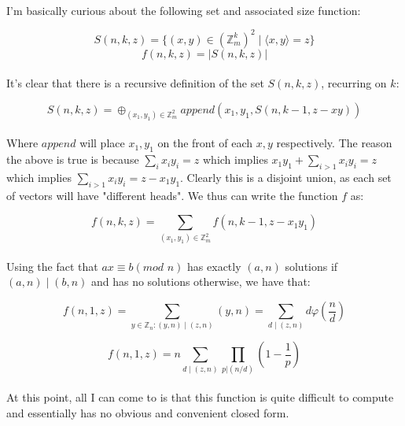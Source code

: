 \documentclass{article}
\begin{document}
\paragraph*{}
  I'm basically curious about the following set and associated size function:

\[S(n, k, z) = \{ (x, y) \in (\mathbb{Z}_m^k)^2 \mid \langle x, y \rangle = z \} \] 
\[f(n, k, z) = |S(n, k, z)| \]

\paragraph*{}
  It's clear that there is a recursive definition of the set $S(n, k, z)$, recurring
  on $k$:

\[ S(n, k, z) = \oplus_{(x_1, y_1) \in \mathbb{Z}_m^2} append(x_1, y_1, S(n, k - 1, z - xy)) \]

\paragraph*{}
  Where $append$ will place $x_1, y_1$ on the front of each $x, y$ respectively. The reason
  the above is true is because $\sum_i x_i y_i = z$ which implies $x_1 y_1 + \sum_{i>1} x_i y_i = z$
  which implies $\sum_{i>1}x_iy_i = z - x_1y_1$. Clearly this is a disjoint union, as each
  set of vectors will have "different heads". We thus can write the function $f$ as:

\[ f(n, k, z) = \sum_{(x_1, y_1) \in \mathbb{Z}_m^2} f(n, k - 1, z - x_1y_1) \]

\paragraph*{}
  Using the fact that $ax \equiv b (\textit{mod } n)$ has exactly $(a, n)$ solutions if $(a, n) \mid
  (b, n)$ and has no solutions otherwise, we have that:

\[ f(n, 1, z) = \sum_{y \in \mathbb{Z}_n : (y, n) \mid (z, n)} (y, n) = \sum_{d \mid (z, n)} d \varphi(\frac{n}{d}) \]

\[ f(n, 1, z) = n \sum_{d \mid (z, n)} \prod_{p | (n / d)} (1 - \frac{1}{p}) \]

\paragraph*{}
  At this point, all I can come to is that this function is quite difficult to compute and
  essentially has no obvious and convenient closed form.
\end{document}
